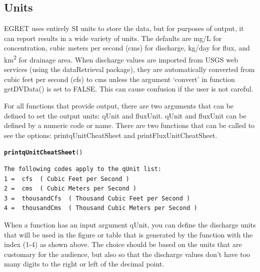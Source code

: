 \documentclass[a4paper,11pt]{article}\usepackage[]{graphicx}\usepackage[]{color}
\makeatletter
\newcommand{\hlstd}[1]{\textcolor[rgb]{0.345,0.345,0.345}{#1}}%
\newcommand{\hlkwd}[1]{\textcolor[rgb]{0.737,0.353,0.396}{\textbf{#1}}}%
\newenvironment{kframe}{%
 \def\at@end@of@kframe{}%
 \ifinner\ifhmode%
  \def\at@end@of@kframe{\end{minipage}}%
  \begin{minipage}{\columnwidth}%
 \fi\fi%
 \def\FrameCommand##1{\hskip\@totalleftmargin \hskip-\fboxsep
 \colorbox{shadecolor}{##1}\hskip-\fboxsep
     \hskip-\linewidth \hskip-\@totalleftmargin \hskip\columnwidth}%
 \MakeFramed {\advance\hsize-\width
   \@totalleftmargin\z@ \linewidth\hsize
   \@setminipage}}%
 {\par\unskip\endMakeFramed%
 \at@end@of@kframe}
\newenvironment{knitrout}{}{} %
\makeatother
\begin{document}
\FloatBarrier
\pagebreak


\subsection{Units}
\label{sec:units}
EGRET uses entirely SI units to store the data, but for purposes of output, it can report results in a wide variety of units. The defaults are mg/L for concentration, cubic meters per second (cms) for discharge, kg/day for flux, and km\textsuperscript{2} for drainage area. When discharge values are imported from USGS web services (using the dataRetrieval package), they are automatically converted from cubic feet per second (cfs) to cms unless the argument `convert' in function getDVData() is set to FALSE.  This can cause confusion if the user is not careful. 

For all functions that provide output, there are two arguments that can be defined to set the output units: qUnit and fluxUnit.  qUnit and fluxUnit can be defined by a numeric code or name.  There are two functions that can be called to see the options: printqUnitCheatSheet and printFluxUnitCheatSheet.


\begin{knitrout}
\color{fgcolor}\begin{kframe}
\begin{alltt}
\hlkwd{printqUnitCheatSheet}\hlstd{()}
\end{alltt}
\begin{verbatim}
The following codes apply to the qUnit list:
1 =  cfs  ( Cubic Feet per Second )
2 =  cms  ( Cubic Meters per Second )
3 =  thousandCfs  ( Thousand Cubic Feet per Second )
4 =  thousandCms  ( Thousand Cubic Meters per Second )
\end{verbatim}
\end{kframe}
\end{knitrout}

When a function has an input argument qUnit, you can define the discharge units that will be used in the figure or table that is generated by the function with the index (1-4) as shown above. The choice should be based on the units that are customary for the audience, but also so that the discharge values don't have too many digits to the right or left of the decimal point.
\end{document}
